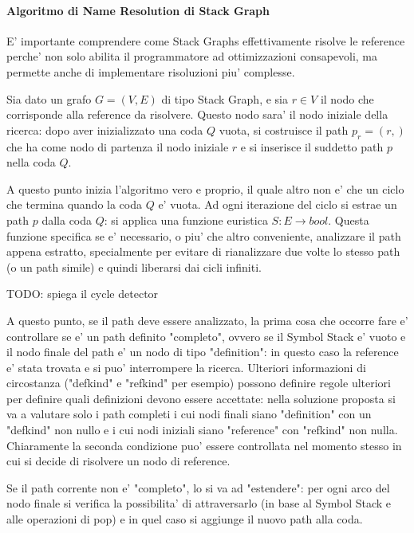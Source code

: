 \paragraph{Algoritmo di Name Resolution di Stack Graph}

E' importante comprendere come Stack Graphs effettivamente risolve le reference perche' non solo abilita il programmatore ad ottimizzazioni consapevoli, ma permette anche di implementare risoluzioni piu' complesse.

\par
Sia dato un grafo $G = (V, E)$ di tipo Stack Graph, e sia $r \in V$ il nodo che corrisponde alla reference da risolvere. Questo nodo sara' il nodo iniziale della ricerca: dopo aver inizializzato una coda $Q$ vuota, si costruisce il path $p_r = (r,)$ che ha come nodo di partenza il nodo iniziale $r$ e si inserisce il suddetto path $p$ nella coda $Q$.

\par
A questo punto inizia l'algoritmo vero e proprio, il quale altro non e' che un ciclo che termina quando la coda $Q$ e' vuota.
Ad ogni iterazione del ciclo si estrae un path $p$ dalla coda $Q$: si applica una funzione euristica $S : E \rightarrow bool$.
Questa funzione specifica se e' necessario, o piu' che altro conveniente, analizzare il path appena estratto, specialmente per evitare di rianalizzare due volte lo stesso path (o un path simile) e quindi liberarsi dai cicli infiniti.

TODO: spiega il cycle detector

\par
A questo punto, se il path deve essere analizzato, la prima cosa che occorre fare e' controllare se e' un path definito "completo", ovvero se il Symbol Stack e' vuoto e il nodo finale del path e' un nodo di tipo "definition": in questo caso la reference e' stata trovata e si puo' interrompere la ricerca.
Ulteriori informazioni di circostanza ("defkind" e "refkind" per esempio) possono definire regole ulteriori per definire quali definizioni devono essere accettate: nella soluzione proposta si va a valutare solo i path completi i cui nodi finali siano "definition" con un "defkind" non nullo e i cui nodi iniziali siano "reference" con "refkind" non nulla. Chiaramente la seconda condizione puo' essere controllata nel momento stesso in cui si decide di risolvere un nodo di reference.

\par
Se il path corrente non e' "completo", lo si va ad "estendere": per ogni arco del nodo finale si verifica la possibilita' di attraversarlo (in base al Symbol Stack e alle operazioni di pop) e in quel caso si aggiunge il nuovo path alla coda.

